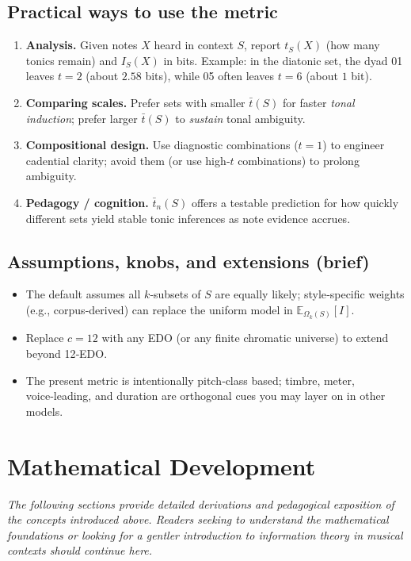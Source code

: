 \documentclass[10pt,twocolumn]{article}
\numberwithin{equation}{section} %
\begin{document}
    \subsection*{Practical ways to use the metric}
    \begin{enumerate}
        \item \textbf{Analysis.} Given notes $X$ heard in context $S$, report $t_S(X)$ (how many tonics remain) and $I_S(X)$ in bits.
Example: in the diatonic set, the dyad 01 leaves $t{=}2$ (about $2.58$ bits), while 05 often leaves $t{=}6$ (about $1$ bit).
        \item \textbf{Comparing scales.} Prefer sets with smaller $\bar{t}(S)$ for faster \emph{tonal induction}; prefer larger $\bar{t}(S)$ to \emph{sustain} tonal ambiguity.
        \item \textbf{Compositional design.} Use diagnostic combinations ($t{=}1$) to engineer cadential clarity; avoid them (or use high‑$t$ combinations) to prolong ambiguity.
        \item \textbf{Pedagogy / cognition.} $\bar{t}_n(S)$ offers a testable prediction for how quickly different sets yield stable tonic inferences as note evidence accrues.
    \end{enumerate}

    \subsection*{Assumptions, knobs, and extensions (brief)}
    \begin{itemize}
        \item The default assumes all $k$‑subsets of $S$ are equally likely; style‑specific weights (e.g., corpus‑derived) can replace the uniform model in $\mathbb{E}_{\Omega_k(S)}[I]$.
        \item Replace $c{=}12$ with any EDO (or any finite chromatic universe) to extend beyond 12‑EDO.
        \item The present metric is intentionally pitch‑class based; timbre, meter, voice‑leading, and duration are orthogonal cues you may layer on in other models.
    \end{itemize}


    \section{Mathematical Development}\label{sec:math-dev}

    \textit{The following sections provide detailed derivations and pedagogical exposition of the concepts introduced above.
Readers seeking to understand the mathematical foundations or looking for a gentler introduction to information theory in musical contexts should continue here.}
\end{document}
